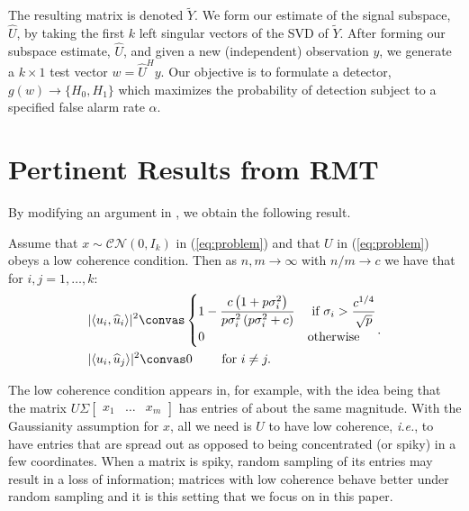 The resulting matrix is denoted $\widetilde{Y}$. We form our estimate of the signal subspace, $\widehat{U}$, by taking the first $k$ left singular vectors of the SVD of $\widetilde{Y}$. After forming our subspace estimate, $\widehat{U}$,  and given a new (independent) observation $y$, we generate a $k \times 1$ test vector $w=\widehat{U}^Hy$. Our objective is to formulate a detector, $g(w)\to\{H_0,H_1\}$ which maximizes the probability of detection subject to a specified false alarm rate  $\alpha$.

\section{Pertinent Results from RMT}\label{sec:rmt}

By modifying an argument in  \cite{benaych2011singular}, we obtain the following result.
\begin{Th}\label{th:angles}
Assume that $x \sim \mathcal{CN}(0,I_{k})$ in (\ref{eq:problem}) and that $U$ in (\ref{eq:problem}) obeys a low coherence condition. Then as $n,m \longrightarrow \infty$ with $n/m \to c$ we have that for $i,j = 1, \ldots, k$:
\begin{equation*}
\begin{aligned}
&|\langle u_i,\widehat{u}_i\rangle|^2\convas
\begin{cases}
1-\dfrac{c\left(1+p\sigma_i^2\right)}{p\sigma_i^2\left(p\sigma_i^2 + c\right)} & \text{ if } \sigma_{i}>\dfrac{c^{1/4}}{\sqrt{p}}\\
0 & \textrm{otherwise}\\
\end{cases}\\
&|\langle u_i,\widehat{u}_j\rangle|^2\convas 0 \qquad \textrm{ for } i \neq j.\\
\end{aligned}.
\end{equation*}
\end{Th}

The low coherence condition appears in, for example, \cite{balzano2010high} with the idea being that the matrix $U\Sigma \begin{bmatrix} x_{1} & \ldots & x_{m} \end{bmatrix}$ has entries of about the same magnitude. With the Gaussianity assumption for $x$, all we need is $U$ to have low coherence, \textit{i.e.}, to have entries that are spread out as opposed to being concentrated (or spiky) in a few coordinates. When a matrix is  spiky, random sampling of its entries may result in a loss of information; matrices with low coherence behave better under random sampling and it is this setting that we focus on in this paper.

